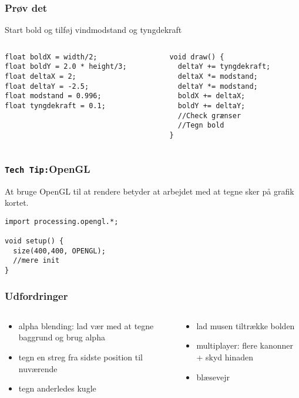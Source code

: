 \documentclass{beamer}
\begin{document}
\begin{frame}[fragile]
  \frametitle{Prøv det}
Start bold og tilføj vindmodstand og tyngdekraft
  \begin{columns}
    \begin{column}{0.5\textwidth}
\begin{verbatim}
float boldX = width/2;
float boldY = 2.0 * height/3;
float deltaX = 2;
float deltaY = -2.5;
float modstand = 0.996;
float tyngdekraft = 0.1;
\end{verbatim}
    \end{column}
    \begin{column}{0.5\textwidth}
\begin{verbatim} 
void draw() {
  deltaY += tyngdekraft;
  deltaX *= modstand;
  deltaY *= modstand;
  boldX += deltaX;
  boldY += deltaY;
  //Check grænser
  //Tegn bold
}
\end{verbatim}

    \end{column}
  \end{columns}
\end{frame}


\begin{frame}[fragile]
  \frametitle{\texttt{Tech Tip:}OpenGL}

  At bruge OpenGL til at rendere betyder at arbejdet med at tegne sker
  på grafik kortet.

\begin{verbatim}
import processing.opengl.*;

void setup() {
  size(400,400, OPENGL);
  //mere init
}
\end{verbatim}


\end{frame}

\begin{frame}
  \frametitle{Udfordringer}

  \begin{columns}
    \begin{column}{0.5\textwidth}
      \begin{itemize}
      \item alpha blending: lad vær med at tegne baggrund og brug alpha
      \item tegn en streg fra sidste position til nuværende
      \item tegn anderledes kugle
      \end{itemize}
    \end{column}
    \begin{column}{0.5\textwidth}
      \begin{itemize}
      \item lad musen tiltrække bolden
      \item multiplayer: flere kanonner + skyd hinaden
      \item blæsevejr
      \end{itemize}
    \end{column}
    
  \end{columns}

\end{frame}
\end{document}
